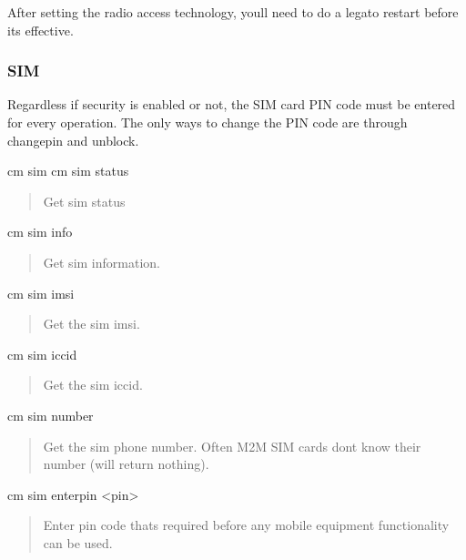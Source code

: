 After setting the radio access technology, you\textquotesingle{}ll need to do a {\ttfamily legato restart} before it\textquotesingle{}s effective.\hypertarget{tools_target_cm_toolsTarget_cm_sim}{}\subsubsection{S\+I\+M}\label{tools_target_cm_toolsTarget_cm_sim}
Regardless if security is enabled or not, the S\+I\+M card P\+I\+N code must be entered for every operation. The only ways to change the P\+I\+N code are through {\ttfamily changepin} and {\ttfamily unblock}.

\begin{DoxyVerb}cm sim
cm sim status \end{DoxyVerb}
 \begin{quote}
Get sim status \end{quote}


\begin{DoxyVerb}cm sim info \end{DoxyVerb}
 \begin{quote}
Get sim information. \end{quote}


\begin{DoxyVerb}cm sim imsi \end{DoxyVerb}
 \begin{quote}
Get the sim imsi. \end{quote}


\begin{DoxyVerb}cm sim iccid \end{DoxyVerb}
 \begin{quote}
Get the sim iccid. \end{quote}


\begin{DoxyVerb}cm sim number \end{DoxyVerb}
 \begin{quote}
Get the sim phone number. Often M2\+M S\+I\+M cards don\textquotesingle{}t know their number (will return nothing). \end{quote}


\begin{DoxyVerb}cm sim enterpin <pin> \end{DoxyVerb}
 \begin{quote}
Enter pin code that\textquotesingle{}s required before any mobile equipment functionality can be used. \end{quote}


